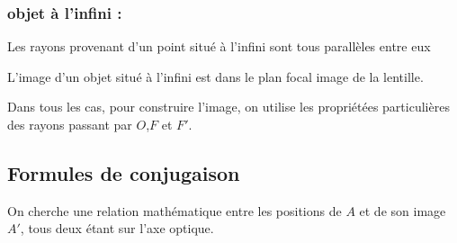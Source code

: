 \documentclass{cours}
\begin{document}
\subsubsection{objet à l'infini : }
Les rayons provenant d'un point situé à l'infini sont tous parallèles entre eux 

\vspace{1em}
\noindent\begin{minipage}{0.5\linewidth}
  \begin{center}
  \end{center}
\end{minipage}%
\begin{minipage}{0.5\linewidth}
L'image d'un objet situé à l'infini est dans le plan focal image de la lentille.
\end{minipage}

Dans tous les cas, pour construire l'image, on utilise les propriétées particulières des rayons passant par $O$,$F$ et $F'$.

\subsection{Formules de conjugaison}
On cherche une relation mathématique entre les positions de $A$ et de son image  $A'$, tous deux étant sur l'axe optique.
\end{document}

